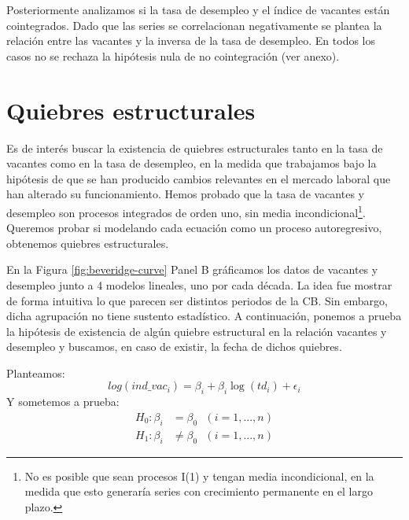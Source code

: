 \documentclass[12pt,oneside]{reedthesis}
\begin{document}
Posteriormente analizamos si la tasa de desempleo y el índice de vacantes están cointegrados. Dado que las series se correlacionan negativamente se plantea la relación entre las vacantes y la inversa de la tasa de desempleo. En todos los casos no se rechaza la hipótesis nula de no cointegración (ver anexo).

\hypertarget{quiebres-estructurales-1}{%
\section{Quiebres estructurales}\label{quiebres-estructurales-1}}

Es de interés buscar la existencia de quiebres estructurales tanto en la tasa de vacantes como en la tasa de desempleo, en la medida que trabajamos bajo la hipótesis de que se han producido cambios relevantes en el mercado laboral que han alterado su funcionamiento. Hemos probado que la tasa de vacantes y desempleo son procesos integrados de orden uno, sin media incondicional\footnote{No es posible que sean procesos I(1) y tengan media incondicional, en la medida que esto generaría series con crecimiento permanente en el largo plazo.}. Queremos probar si modelando cada ecuación como un proceso autoregresivo, obtenemos quiebres estructurales.

En la Figura \ref{fig:beveridge-curve} Panel B gráficamos los datos de vacantes y desempleo junto a 4 modelos lineales, uno por cada década. La idea fue mostrar de forma intuitiva lo que parecen ser distintos periodos de la CB. Sin embargo, dicha agrupación no tiene sustento estadístico. A continuación, ponemos a prueba la hipótesis de existencia de algún quiebre estructural en la relación vacantes y desempleo y buscamos, en caso de existir, la fecha de dichos quiebres.

Planteamos:
\begin{equation}
log(ind\_vac_i) = \beta_i + \beta_i\log(td_i) + \epsilon_i
\end{equation}
Y sometemos a prueba:
\begin{align}
H_0: \beta_i &= \beta_0 \ \ \ (i = 1, ..., n) \\
H_1: \beta_i &\not= \beta_0 \ \ \ (i = 1, ..., n)
\end{align}
\end{document}
